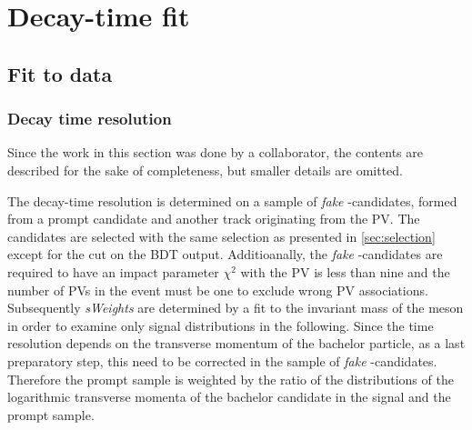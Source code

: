 \chapter{Decay-time fit}


\section{Fit to data}


\subsection{Decay time resolution}
\label{sec:resolution}

Since the work in this section was done by a collaborator, the contents are described for the sake of completeness, but smaller details are omitted.

The decay-time resolution is determined on a sample of \emph{fake} \Bz-candidates, formed from a prompt \Dpm candidate and another track originating from the PV.
The candidates are selected with the same selection as presented in \cref{sec:selection} except for the cut on the BDT output.
Additioanally, the \emph{fake} \Bz-candidates are required to have an impact parameter $\chi^2$ with the PV is less than nine and the number of \ac{PV}s in the event must be one to exclude wrong \ac{PV} associations.
Subsequently \emph{sWeights} are determined by a fit to the invariant mass of the \Dpm meson in order to examine only signal distributions in the following.
Since the time resolution depends on the transverse momentum of the bachelor particle, as a last preparatory step, this need to be corrected in the sample of \emph{fake} \Bz-candidates.
Therefore the prompt sample is weighted by the ratio of the distributions of the logarithmic transverse momenta of the bachelor candidate in the signal \BdToDpi and the prompt sample.

